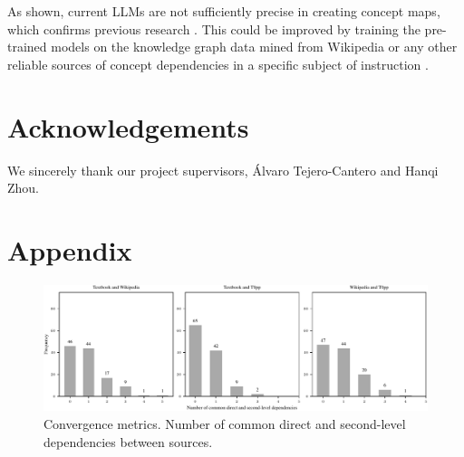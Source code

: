 \documentclass{article}
\begin{document}
As shown, current LLMs are not sufficiently precise in creating concept maps, which confirms previous research \cite{hwang2021comet}. This could be improved by training the pre-trained models on the knowledge graph data mined from Wikipedia or any other reliable sources of concept dependencies in a specific subject of instruction \cite{west2022symbolic}.

\section{Acknowledgements}
We sincerely thank our project supervisors, Álvaro Tejero-Cantero and Hanqi Zhou.



\newpage


\section{Appendix}



\begin{figure}[H]
    \centering
    \includegraphics[width=.95\textwidth]{img/comp_second_deps.pdf}
    \caption{Convergence metrics. Number of common direct and second-level dependencies between sources.}
    \label{fig:comp_second_deps}
\end{figure}
\end{document}
